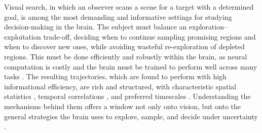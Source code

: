 Visual search, in which an observer scans a scene for a target with a determined goal, is among the most demanding and informative settings for studying decision-making in the brain. The subject must balance an exploration--exploitation trade-off, deciding when to continue sampling promising regions and when to discover new ones, while avoiding wasteful re-exploration of depleted regions. This must be done efficiently and robustly within the brain, as neural computation is costly and the brain must be trained to perform well across many tasks \cite{Gherri2011-wl, Li2026-oa, Wright1995-ji, harrison_cost_2023, mangun_sustained_1998}. The resulting trajectories, which are found to perform with high informational efficiency, are rich and structured, with characteristic spatial statistics \cite{collewijn_significance_2008, morita_eye_2017, papanikolaou_levy_2024}, temporal correlations \cite{chota_rhythmic_2018, han_gamma_2022}, and preferred timescales \cite{spyropoulos_theta_2018, kawashima_attentional_2022, rucci_temporal_2018}. Understanding the mechanisms behind them offers a window not only onto vision, but onto the general strategies the brain uses to explore, sample, and decide under uncertainty \cite{renninger_where_2007, knill_bayesian_2004, orban_neural_2016, delacour_neural_1997, terada_chaotic_2024, qi_fractional_2022, dong_neural_nodate}.%

